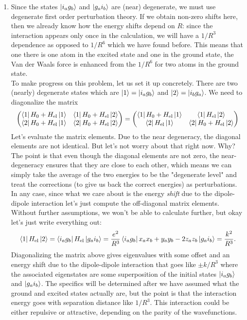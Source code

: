 \documentclass{article}
\theoremstyle{definition}
\newcommand{\f}[2]{\frac{#1}{#2}}
\begin{document}
\begin{enumerate}[label=(\alph*)]


\item Since the states $\ket{i_a g_b}$ and $\ket{g_a i_b}$ are (near) degenerate, we must use degenerate first order perturbation theory. If we obtain non-zero shifts here, then we already know how the energy shifts depend on $R$: since the interaction appears only once in the calculation, we will have a $\boxed{1/R^3}$ dependence as opposed to $1/R^6$ which we have found before. This means that one there is one atom in the excited state and one in the ground state, the Van der Waals force is enhanced from the $1/R^6$ for two atoms in the ground state. \\

To make progress on this problem, let us set it up concretely. There are two (nearly) degenerate states which are $\ket{1} = \ket{i_a g_b}$ and $\ket{2} = \ket{i_b g_a}$. We need to diagonalize the matrix
\begin{align*}
\begin{pmatrix}
\bra{1} H_0 + H_\text{el} \ket{1} & \bra{1} H_0 + H_\text{el} \ket{2} \\
\bra{2} H_0 + H_\text{el} \ket{1} & \bra{2} H_0 + H_\text{el} \ket{2}
\end{pmatrix} = 
\begin{pmatrix}
\bra{1} H_0 + H_\text{el} \ket{1} & \bra{1} H_\text{el} \ket{2} \\
\bra{2}  H_\text{el} \ket{1} & \bra{2} H_0 + H_\text{el} \ket{2}
\end{pmatrix} 
\end{align*}
Let's evaluate the matrix elements. Due to the near degeneracy, the diagonal elements are not identical. But let's not worry about that right now. Why? The point is that even though the diagonal elements are not zero, the near-degeneracy ensures that they are close to each other, which means we can simply take the average of the two energies to be the "degenerate level" and treat the corrections (to give us back the correct energies) as perturbations. In any case, since what we care about is the energy \textit{shift} due to the dipole-dipole interaction let's just compute the off-diagonal matrix elements. Without further assumptions, we won't be able to calculate further, but okay let's just write everything out:
\begin{align*}
\bra{1} H_\text{el} \ket{2} = \bra{i_a g_b} H_\text{el} \ket{g_a i_b} = 
\f{e^2}{R^3} \bra{i_a g_b} x_a x_b + y_a y_b - 2z_a z_b \ket{g_a i_b} = \f{k^2}{R^3}.
\end{align*}
Diagonalizing the matrix above gives eigenvalues with some offset and an energy shift due to the dipole-dipole interaction that goes like $\pm k/R^3$ where the associated eigenstates are some superposition of the initial states $\ket{i_a g_b}$ and $\ket{g_a i_b}$. The specifics will be determined after we have assumed what the ground and excited states actually are, but the point is that the interaction energy goes with separation distance like $1/R^3$. This interaction could be either repulsive or attractive, depending on the parity of the wavefunctions. \\


\end{enumerate}
\end{document}
